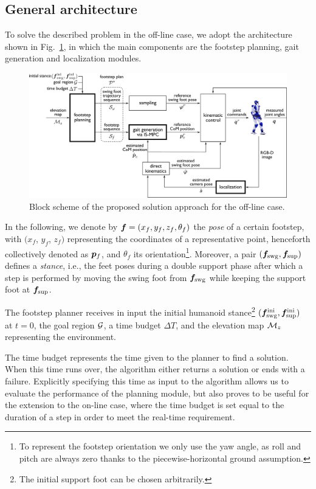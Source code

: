 \subsection{General architecture}
\label{sec:WoS:offlineCase:GeneralArchitecture}
To solve the described problem in the off-line case, we adopt the architecture
shown in Fig.~\ref{fig:WoS:blockScheme1}, in which the main components are the
footstep planning, gait generation and localization modules.

\begin{figure}
    \centering
    \includegraphics[width=\textwidth]{figures/BlockSchemeOffline.pdf}
    \caption{Block scheme of the proposed solution approach for the off-line case.}
    \label{fig:WoS:blockScheme1}
\end{figure}

In the following, we denote by ${\bm{f}} = (x_{f}, y_{f}, z_{f}, \theta_{f})$ the
{\em pose} of a certain footstep, with $(x_{f}$, $y_{f}$, $z_{f})$ representing
the coordinates of a representative point, henceforth collectively denoted as
${\bm{p}}_f$, and $\theta_{f}$ its orientation\footnote{To represent the footstep
orientation we only use the yaw angle, as roll and pitch are always zero thanks
to the piecewise-horizontal ground assumption.}.
Moreover, a pair $({\bm{f}}_{\rm swg}, {\bm{f}}_{\rm sup})$ defines a {\em stance},
i.e., the feet poses during a double support phase after which a step is
performed by moving the swing foot from ${\bm{f}}_{\rm swg}$ while keeping the
support foot at ${\bm{f}}_{\rm sup}$. 

The footstep planner receives in input the initial humanoid
stance\footnote{The initial support foot can be chosen arbitrarily.}
$({\bm{f}}_{\rm swg}^{\rm ini}, {\bm{f}}_{\rm sup}^{\rm ini})$ at $t=0$, the goal
region $\cal G$, a time budget $\Delta T$, and the elevation map ${\cal M}_z$
representing the environment.

The time budget represents the time given to the planner to find a solution.
When this time runs over, the algorithm either returns a solution or ends
with a failure. Explicitly specifying this time as input to the algorithm
allows us to evaluate the performance of the planning module, but also proves
to be useful for the extension to the on-line case, where the time budget is
set equal to the duration of a step in order to meet the real-time requirement.

